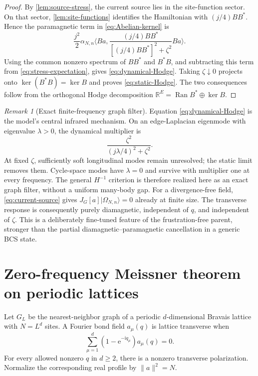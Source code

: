 \documentclass[11pt]{article}
\theoremstyle{definition}
\theoremstyle{remark}
\newtheorem{remark}[theorem]{Remark}
\newcommand{\Ran}{\operatorname{Ran}}
\newcommand{\I}{\mathrm i}
\newcommand{\e}{\mathrm e}
\newcommand{\ket}[1]{\lvert #1\rangle}
\newcommand{\norm}[1]{\lVert #1\rVert}
\newcommand{\ip}[2]{\langle #1,#2\rangle}
\begin{document}
\begin{proof}
By \cref{lem:source-stress}, the current source lies in the site-function sector.  On that sector,
\cref{lem:site-functions} identifies the Hamiltonian with $(j/4)BB^*$.  Hence the paramagnetic term in
\eqref{eq:Abelian-kernel} is
\begin{equation}
 \frac{j^2}{2}\alpha_{N,n}
 \ip{Ba}{
 \frac{(j/4)BB^*}{[(j/4)BB^*]^2+\zeta^2}Ba}.
\end{equation}
Using the common nonzero spectrum of $BB^*$ and $B^*B$, and subtracting this term from
\eqref{eq:stress-expectation}, gives \eqref{eq:dynamical-Hodge}.  Taking $\zeta\downarrow0$ projects
onto $\ker(B^*B)=\ker B$ and proves \eqref{eq:static-Hodge}.  The two consequences follow from the
orthogonal Hodge decomposition
$\mathbb R^E=\Ran B^*\oplus\ker B$.
\end{proof}

\begin{remark}[Exact finite-frequency graph filter]
Equation \eqref{eq:dynamical-Hodge} is the model's central infrared mechanism.  On an edge-Laplacian
eigenmode with eigenvalue $\lambda>0$, the dynamical multiplier is
\begin{equation}
 \frac{\zeta^2}{(j\lambda/4)^2+\zeta^2}.
\end{equation}
At fixed $\zeta$, sufficiently soft longitudinal modes remain unresolved; the static limit removes them.
Cycle-space modes have $\lambda=0$ and survive with multiplier one at every frequency.  The general
$H^{-1}$ criterion is therefore realized here as an exact graph filter, without a uniform many-body gap.
For a divergence-free field, \eqref{eq:current-source} gives
$J_G[a]\ket{\Omega_{N,n}}=0$ already at finite size.  The transverse response is consequently purely
diamagnetic, independent of $q$, and independent of $\zeta$.  This is a deliberately fine-tuned feature
of the frustration-free parent, stronger than the partial diamagnetic--paramagnetic cancellation in a
generic BCS state.
\end{remark}

\section{Zero-frequency Meissner theorem on periodic lattices}
\label{sec:periodic-Meissner}

Let $G_L$ be the nearest-neighbor graph of a periodic $d$-dimensional Bravais lattice with
$N=L^d$ sites.  A Fourier bond field $a_\mu(q)$ is lattice transverse when
\begin{equation}
 \sum_{\mu=1}^d(1-\e^{-\I q_\mu})a_\mu(q)=0.
 \label{eq:lattice-transverse}
\end{equation}
For every allowed nonzero $q$ in $d\ge2$, there is a nonzero transverse polarization.  Normalize the
corresponding real profile by $\norm a^2=N$.
\end{document}

